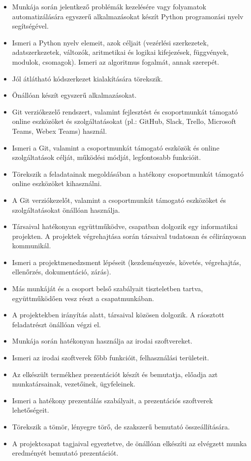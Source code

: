 \begin{itemize}
\item
  Munkája során jelentkező problémák kezelésére vagy folyamatok
  automatizálására egyszerű alkalmazásokat készít Python programozási
  nyelv segítségével.
\item
  Ismeri a Python nyelv elemeit, azok céljait (vezérlési szerkezetek,
  adatszerkezetek, változók, aritmetikai és logikai kifejezések,
  függvények, modulok, csomagok). Ismeri az algoritmus fogalmát, annak
  szerepét.
\item
  Jól átlátható kódszerkezet kialakítására törekszik.
\item
  Önállóan készít egyszerű alkalmazásokat.
\item
  Git verziókezelő rendszert, valamint fejlesztést és csoportmunkát
  támogató online eszközöket és szolgáltatásokat (pl.: GitHub, Slack,
  Trello, Microsoft Teams, Webex Teams) használ.
\item
  Ismeri a Git, valamint a csoportmunkát támogató eszközök és online
  szolgáltatások célját, működési módját, legfontosabb funkcióit.
\item
  Törekszik a feladatainak megoldásában a hatékony csoportmunkát
  támogató online eszközöket kihasználni.
\item
  A Git verziókezelőt, valamint a csoportmunkát támogató eszközöket és
  szolgáltatásokat önállóan használja.
\item
  Társaival hatékonyan együttműködve, csapatban dolgozik egy
  informatikai projekten. A projektek végrehajtása során társaival
  tudatosan és célirányosan kommunikál.
\item
  Ismeri a projektmenedzsment lépéseit (kezdeményezés, követés,
  végrehajtás, ellenőrzés, dokumentáció, zárás).
\item
  Más munkáját és a csoport belső szabályait tiszteletben tartva,
  együttműködően vesz részt a csapatmunkában.
\item
  A projektekben irányítás alatt, társaival közösen dolgozik. A
  ráosztott feladatrészt önállóan végzi el.
\item
  Munkája során hatékonyan használja az irodai szoftvereket.
\item
  Ismeri az irodai szoftverek főbb funkcióit, felhasználási területeit.
\item
  Az elkészült termékhez prezentációt készít és bemutatja, előadja azt
  munkatársainak, vezetőinek, ügyfeleinek.
\item
  Ismeri a hatékony prezentálás szabályait, a prezentációs szoftverek
  lehetőségeit.
\item
  Törekszik a tömör, lényegre törő, de szakszerű bemutató
  összeállítására.
\item
  A projektcsapat tagjaival egyeztetve, de önállóan elkészíti az
  elvégzett munka eredményét bemutató prezentációt.
\end{itemize}

